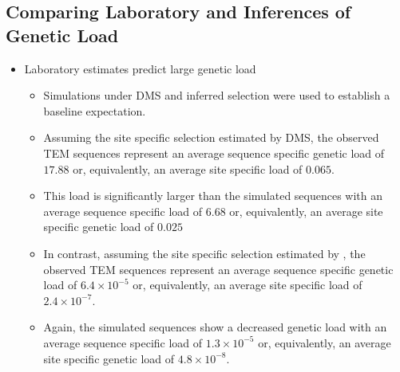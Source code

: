 \documentclass[12pt]{article}
\begin{document}
\subsection*{Comparing Laboratory and \selac Inferences of Genetic Load}
\begin{itemize}
	\item Laboratory estimates predict large genetic load
	\begin{itemize}
		\item Simulations under DMS and \selac inferred selection were used to establish a baseline expectation.
		\item Assuming the site specific selection estimated by DMS, the observed TEM sequences represent an average sequence specific genetic load of $17.88$ or, equivalently, an average site specific load of $0.065$.
		\item This load is significantly larger than the simulated sequences with an average sequence specific load of $6.68$ or, equivalently, an average site specific genetic load of $0.025$
		\item In contrast, assuming the site specific selection estimated by \selac, the observed TEM sequences represent an average sequence specific genetic load of $6.4\times10^{-5}$ or, equivalently, an average site specific load of $2.4\times10^{-7}$.
		\item Again, the simulated sequences show a decreased genetic load with an average sequence specific load of $1.3\times10^{-5}$ or, equivalently, an average site specific genetic load of $4.8\times10^{-8}$.
	\end{itemize}
\end{itemize}
\end{document}
